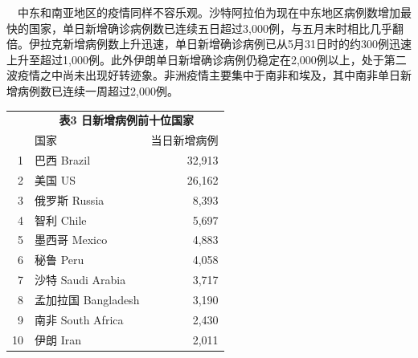 \documentclass[
]{article}
\begin{document}
\(\quad\)中东和南亚地区的疫情同样不容乐观。沙特阿拉伯为现在中东地区病例数增加最快的国家，单日新增确诊病例数已连续五日超过3,000例，与五月末时相比几乎翻倍。伊拉克新增病例数上升迅速，单日新增确诊病例已从5月31日时的约300例迅速上升至超过1,000例。此外伊朗单日新增确诊病例仍稳定在2,000例以上，处于第二波疫情之中尚未出现好转迹象。非洲疫情主要集中于南非和埃及，其中南非单日新增病例数已连续一周超过2,000例。

\begin{table}[H]
    \centering \begin{table}[H]
\centering\begingroup\fontsize{20}{22}\selectfont

\begin{tabular}{rlr}
\toprule
\multicolumn{0}{c}{\textbf{ }} & \multicolumn{2}{c}{\textbf{表3 日新增病例前十位国家}} \\
  & 国家 & 当日新增病例\\
\midrule
\rowcolor{gray!6}  1 & 巴西 Brazil & 32,913\\
2 & 美国 US & 26,162\\
\rowcolor{gray!6}  3 & 俄罗斯 Russia & 8,393\\
4 & 智利 Chile & 5,697\\
\rowcolor{gray!6}  5 & 墨西哥 Mexico & 4,883\\
6 & 秘鲁 Peru & 4,058\\
\rowcolor{gray!6}  7 & 沙特 Saudi Arabia & 3,717\\
8 & 孟加拉国 Bangladesh & 3,190\\
\rowcolor{gray!6}  9 & 南非 South Africa & 2,430\\
10 & 伊朗 Iran & 2,011\\
\bottomrule
\end{tabular}
\endgroup{}
\end{table} \end{table}\begin{table}[H]
    \centering \begin{table}[H]
\centering\begingroup\fontsize{20}{22}\selectfont


\end{table}
\end{table}
\end{document}
